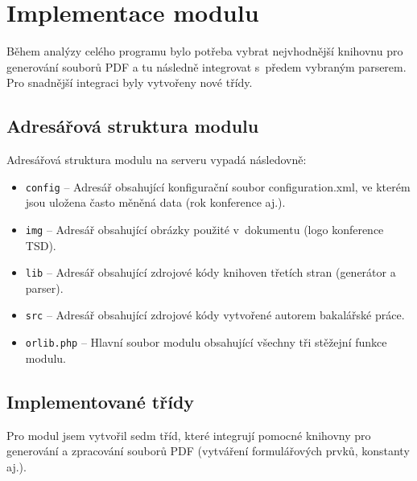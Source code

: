 \DeclarePairedDelimiter\ceil{\lceil}{\rceil}
\DeclarePairedDelimiter\floor{\lfloor}{\rfloor}

\chapter{Implementace modulu}
Během analýzy celého programu bylo potřeba vybrat nejvhodnější knihovnu pro generování souborů PDF a tu následně integrovat s~předem vybraným parserem. Pro snadnější integraci byly vytvořeny nové třídy.
\section{Adresářová struktura modulu}
Adresářová struktura modulu na serveru vypadá následovně:
\begin{itemize}
	\item \verb|config| -- Adresář obsahující konfigurační soubor configuration.xml, ve kterém jsou uložena často měněná data (rok konference aj.).  
	\item \verb|img| -- Adresář obsahující obrázky použité v~dokumentu (logo konference TSD).
	\item \verb|lib| -- Adresář obsahující zdrojové kódy knihoven třetích stran (generátor a parser).
	\item \verb|src| -- Adresář obsahující zdrojové kódy vytvořené autorem bakalářské práce.
	\item \verb|orlib.php| -- Hlavní soubor modulu obsahující všechny tři stěžejní funkce modulu.
\end{itemize}
\section{Implementované třídy}
Pro modul jsem vytvořil sedm tříd, které integrují pomocné knihovny pro generování a zpracování souborů PDF (vytváření formulářových prvků, konstanty aj.).
